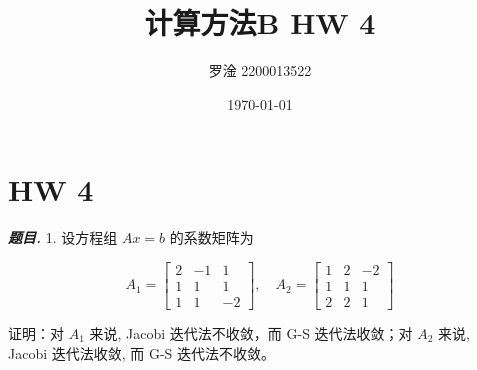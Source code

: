 \documentclass[10pt, a4paper, oneside]{ctexart}
\title{\textbf{计算方法B  HW 4}}
\author{罗淦  2200013522}
\date{\today}
\newenvironment{problem}{\begin{framed}\par\noindent\textbf{\textit{题目. }}}{\end{framed}\par}
\begin{document}
\maketitle


\section{HW 4}
\begin{problem}
    1. 设方程组 $A x=b$ 的系数矩阵为

    $$
    A_1=\left[\begin{array}{rrr}
    2 & -1 & 1 \\
    1 & 1 & 1 \\
    1 & 1 & -2
    \end{array}\right], \quad A_2=\left[\begin{array}{rrr}
    1 & 2 & -2 \\
    1 & 1 & 1 \\
    2 & 2 & 1
    \end{array}\right]
    $$
    
    
    证明：对 $A_1$ 来说, Jacobi 迭代法不收敛，而 G-S 迭代法收敛；对 $A_2$ 来说, Jacobi 迭代法收敛, 而 G-S 迭代法不收敛。
\end{problem}
\end{document}
